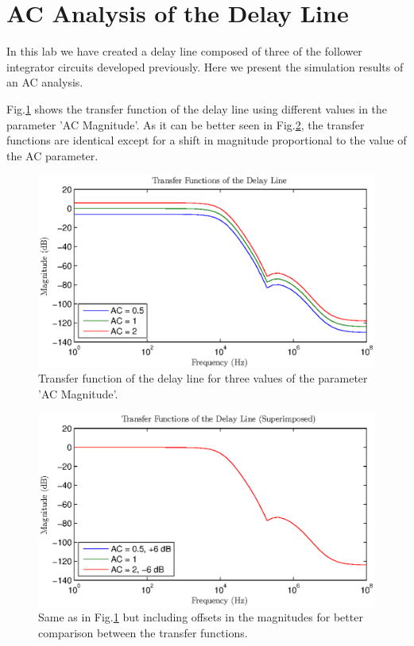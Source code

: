 

\newcommand{\reffig}[1]{Fig.~\ref{#1}}



\newpage
\section{AC Analysis of the Delay Line}
In this lab we have created a delay line composed of three of the follower integrator circuits developed previously. Here we present the simulation results of an AC analysis. 

Fig.\ref{fig:1} shows the transfer function of the delay line using different values in the parameter 'AC Magnitude'. As it can be better seen in Fig.\ref{fig:2}, the transfer functions are identical except for a shift in magnitude proportional to the value of the AC parameter. 
\begin{figure}[!h]
	\center
	\includegraphics{exp1.eps}
	\caption{Transfer function of the delay line for three values of the parameter 'AC Magnitude'.}
	\label{fig:1}
\end{figure}

\begin{figure}[!h]
	\center
	\includegraphics{exp1b.eps}
	\caption{Same as in Fig.\ref{fig:1} but including offsets in the magnitudes for better comparison between the transfer functions.}
	\label{fig:2}
\end{figure}

